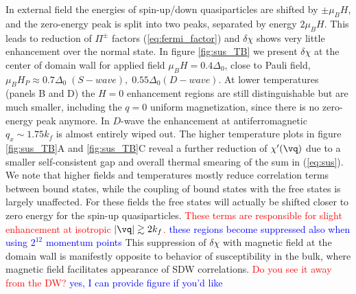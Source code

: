 \documentclass[prb,aps,showpacs,amsmath,twocolumn,10pt]{revtex4-1}
\newcommand{\blue}{\textcolor{blue}}
\newcommand{\red}{\textcolor{red}}
\begin{document}
In external field the energies of spin-up/down quasiparticles are shifted by $\pm \mu_B H$, 
and the zero-energy peak is split into two peaks, separated by energy $2\mu_B H$. This leads to 
reduction of $\Pi^{\pm}$ factors (\ref{eq:fermi_factor}) 
and $\delta\chi$ shows very little enhancement over the normal state. 
In figure \ref{fig:sus_TB} we present $\delta\chi$ at the center of domain wall for applied field
$\mu_B H = 0.4\Delta_0$, close to Pauli field, $\mu_B H_P \approx 0.7 \Delta_0\; (S-wave),\; 0.55\Delta_0 (D-wave)$. 
At lower temperatures (panels B and D) the $H=0$ enhancement regions %
are still distinguishable but are much smaller, including the $q=0$ uniform magnetization, since there is no 
zero-energy peak anymore. In $D$-wave the enhancement at antiferromagnetic $q_x \sim 1.75 k_f$ is 
almost entirely wiped out. 
The higher temperature plots in figure \ref{fig:sus_TB}A and \ref{fig:sus_TB}C
reveal a further reduction of $\chi'(\vq)$ due to a smaller self-consistent gap
and overall thermal smearing of the sum in (\ref{eq:sus}).   
We note that higher fields and temperatures mostly reduce correlation terms between bound states, 
while the coupling of bound states with the free states is largely unaffected. 
For these fields the free states will
actually be shifted closer to zero energy for the spin-up quasiparticles.
\red{These terms are responsible for slight enhancement at isotropic $|\vq| \gtrsim 2k_f$.}
\blue{these regions become suppressed also when using $2^{12}$ momentum points}
%
This suppression of $\delta\chi$ with magnetic field at the domain wall is manifestly opposite 
to behavior of susceptibility in the bulk, where magnetic field facilitates appearance of SDW 
correlations.\cite{sc_afm_kato,Rosemeyer2014} 
\red{Do you see it away from the DW?} \blue{yes, I can provide figure if you'd like}
\end{document}
